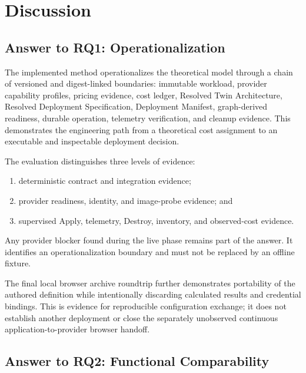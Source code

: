 \chapter{\label{chap:discussion}Discussion}


\section{Answer to RQ1: Operationalization}

The implemented method operationalizes the theoretical model through a chain
of versioned and digest-linked boundaries: immutable workload, provider
capability profiles, pricing evidence, cost ledger, Resolved Twin Architecture,
Resolved Deployment Specification, Deployment Manifest, graph-derived
readiness, durable operation, telemetry verification, and cleanup evidence.
This demonstrates the engineering path from a theoretical cost assignment to
an executable and inspectable deployment decision.

The evaluation distinguishes three levels of evidence:

\begin{enumerate}
    \item deterministic contract and integration evidence;
    \item provider readiness, identity, and image-probe evidence; and
    \item supervised Apply, telemetry, Destroy, inventory, and observed-cost
    evidence.
\end{enumerate}

Any provider blocker found during the live phase remains part of the answer. It
identifies an operationalization boundary and must not be replaced by an
offline fixture.

The final local browser archive roundtrip further demonstrates portability of
the authored definition while intentionally discarding calculated results and
credential bindings. This is evidence for reproducible configuration exchange;
it does not establish another deployment or close the separately unobserved
continuous application-to-provider browser handoff.

\section{Answer to RQ2: Functional Comparability}

